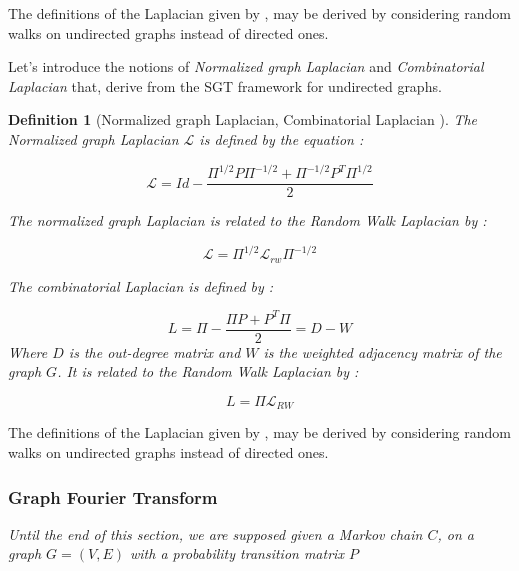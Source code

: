 \documentclass{article}
\newtheorem{definition}{Definition}[section]
\begin{document}
The definitions of the Laplacian given by \cite{shuman_narang_frossard_ortega_vandergheynst_2013, ricaud_borgnat_tremblay_gonçalves_vandergheynst_2019,grinstead_snell_2006}, may be derived by considering random walks on undirected graphs instead of directed ones.

Let's introduce the notions of \textit{Normalized graph Laplacian} and \textit{Combinatorial Laplacian} that, derive from the SGT framework for undirected graphs.

\begin{definition}[Normalized graph Laplacian, Combinatorial Laplacian \cite{sevi2019}]
The Normalized graph Laplacian $\mathcal{L}$ is defined by the equation :

\begin{equation}
    \mathcal{L} = Id - \frac{\Pi^{1/2}P\Pi^{-1/2} + \Pi^{-1/2}P^T\Pi^{1/2}}{2}
\end{equation}

The normalized graph Laplacian is related to the Random Walk Laplacian by :

\begin{equation}
    \mathcal{L} = \Pi^{1/2}\mathcal{L}_{rw}\Pi^{-1/2}
\end{equation}

The combinatorial Laplacian is defined by :

\begin{equation}
    L = \Pi - \frac{\Pi P + P^T \Pi}{2} = D-W
\end{equation}
Where $D$ is the out-degree matrix and $W$ is the weighted adjacency matrix of the graph $G$.
It is related to the Random Walk Laplacian by :

\begin{equation}
    L = \Pi \mathcal{L}_{RW}
\end{equation}

\end{definition}

The definitions of the Laplacian given by \cite{shuman_narang_frossard_ortega_vandergheynst_2013, ricaud_borgnat_tremblay_gonçalves_vandergheynst_2019,grinstead_snell_2006}, may be derived by considering random walks on undirected graphs instead of directed ones.


\subsubsection{Graph Fourier Transform}
\textit{Until the end of this section, we are supposed given a Markov chain $C$, on a graph $G=(V,E)$ with a probability transition matrix $P$}
\end{document}
